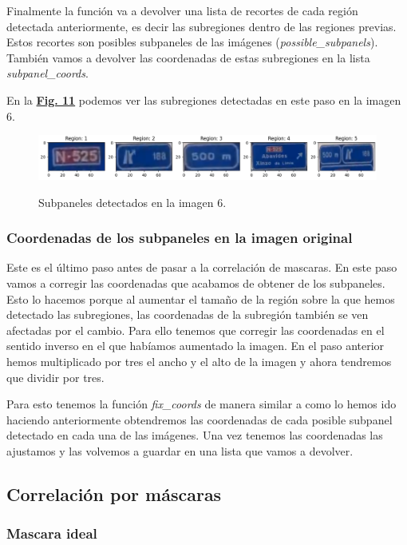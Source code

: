 \documentclass[a4paper, 12pt]{article}
\begin{document}
Finalmente la función va a devolver una lista de recortes de cada región detectada anteriormente, es decir las subregiones dentro de las regiones previas. Estos recortes son posibles subpaneles de las imágenes (\textit{possible\_subpanels}). También vamos a devolver las coordenadas de estas subregiones en la lista 
\textit{subpanel\_coords}.

En la \textbf{\hyperref[fig:subregioness]{Fig. 11}} podemos ver las subregiones detectadas en este paso en la imagen 6.

\begin{figure}[h]
	\centering
	\caption{Subpaneles detectados en la imagen 6.}\vspace{0.5cm}
	\includegraphics[width=0.6\linewidth]{img/subregiones}
	\label{fig:subregioness}
\end{figure}

\subsubsection{Coordenadas de los subpaneles en la imagen original}
Este es el último paso antes de pasar a la correlación de mascaras. En este paso vamos a corregir las coordenadas que acabamos de obtener de los subpaneles. Esto lo hacemos porque al aumentar el tamaño de la región sobre la que hemos detectado las subregiones, las coordenadas de la subregión también se ven afectadas por el cambio. Para ello tenemos que corregir las coordenadas en el sentido inverso en el que habíamos aumentado la imagen. En el paso anterior hemos multiplicado por tres el ancho y el alto de la imagen y ahora tendremos que dividir por tres. 

Para esto tenemos la función \textit{fix\_coords} de manera similar a como lo hemos ido haciendo anteriormente obtendremos las coordenadas de cada posible subpanel detectado en cada una de las imágenes. Una vez tenemos las coordenadas las ajustamos y las volvemos a guardar en una lista que vamos a devolver. 



\subsection{Correlación por máscaras}
\subsubsection{Mascara ideal}
\end{document}
